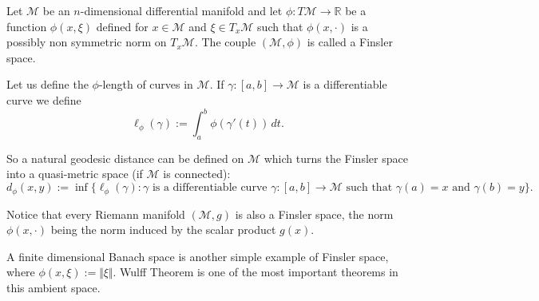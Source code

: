 \documentclass[12pt]{article}
\begin{document}
Let $\mathcal M$ be an
 $n$-dimensional differential manifold and let $\phi\colon T\mathcal M \to \mathbb R$ be a function $\phi(x,\xi)$ defined for $x\in \mathcal M$ and $\xi \in T_x \mathcal M$ such that $\phi(x,\cdot)$ is a possibly non symmetric norm on $T_x\mathcal M$. The couple $(\mathcal M, \phi)$ is called a Finsler space.

Let us define the $\phi$-length of curves in $\mathcal M$. If $\gamma\colon [a,b]\to\mathcal M$ is a differentiable curve we define
\[
  \ell_\phi(\gamma) := \int_a^b \phi(\gamma'(t))\, dt.
\]

So a natural geodesic distance can be defined on $\mathcal M$ which turns the Finsler space into a quasi-metric space (if $\mathcal M$ is connected):
\[
  d_\phi(x,y):= \inf\{\ell_\phi(\gamma)\colon \text{$\gamma$ is a differentiable curve $\gamma\colon[a,b]\to\mathcal M$ such that $\gamma(a)=x$ and $\gamma(b)=y$}\}.
\]

Notice that every Riemann manifold $(\mathcal M,g)$ is also a Finsler space, 
the norm $\phi(x,\cdot)$ being the norm induced by the scalar product $g(x)$.

A finite dimensional Banach space is another simple example of Finsler space, where $\phi(x,\xi):=\Vert \xi \Vert$. Wulff Theorem is one of the most important theorems in this ambient space.
\end{document}
